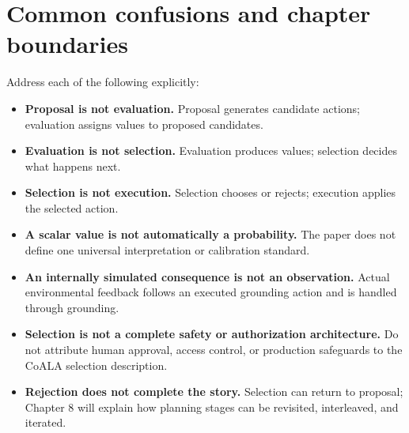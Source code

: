 \section{Common confusions and chapter boundaries}
Address each of the following explicitly:
\begin{itemize}
  \item \textbf{Proposal is not evaluation.} Proposal generates candidate actions; evaluation assigns values to proposed candidates.
  \item \textbf{Evaluation is not selection.} Evaluation produces values; selection decides what happens next.
  \item \textbf{Selection is not execution.} Selection chooses or rejects; execution applies the selected action.
  \item \textbf{A scalar value is not automatically a probability.} The paper does not define one universal interpretation or calibration standard.
  \item \textbf{An internally simulated consequence is not an observation.} Actual environmental feedback follows an executed grounding action and is handled through grounding.
  \item \textbf{Selection is not a complete safety or authorization architecture.} Do not attribute human approval, access control, or production safeguards to the CoALA selection description.
  \item \textbf{Rejection does not complete the story.} Selection can return to proposal; Chapter 8 will explain how planning stages can be revisited, interleaved, and iterated.
\end{itemize}


